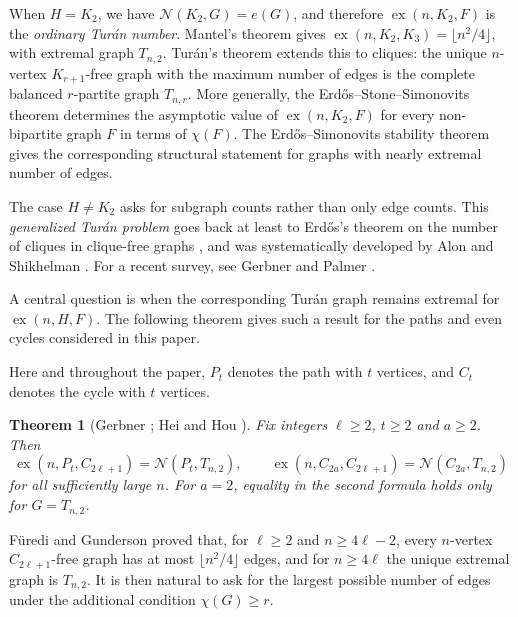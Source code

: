 \documentclass[11pt]{article}
\newtheorem*{knownresult}{Theorem}
\theoremstyle{definition}
\theoremstyle{plain}
\theoremstyle{remark}
\theoremstyle{plain}
\numberwithin{equation}{section}
\DeclareMathOperator{\ex}{ex}
\newcommand{\N}{\mathcal N}
\begin{document}
When $H=K_2$, we have $\N(K_2,G)=e(G)$, and therefore $\ex(n,K_2,F)$ is the \emph{ordinary Tur\'an number}. Mantel's theorem \cite{Mantel1907} gives $\ex(n,K_2,K_3)=\lfloor n^2/4\rfloor$, with extremal graph $T_{n,2}$. Tur\'an's theorem \cite{Turan1941} extends this to cliques: the unique $n$-vertex $K_{r+1}$-free graph with the maximum number of edges is the complete balanced $r$-partite graph $T_{n,r}$. More generally, the Erd\H{o}s--Stone--Simonovits theorem \cite{ErdosStone1946,ErdosSimonovits1966} determines the asymptotic value of $\ex(n,K_2,F)$ for every non-bipartite graph $F$ in terms of $\chi(F)$. The Erd\H{o}s--Simonovits stability theorem \cite{Simonovits1968} gives the corresponding structural statement for graphs with nearly extremal number of edges.

The case $H\ne K_2$ asks for subgraph counts rather than only edge counts. This \emph{generalized Tur\'an problem} goes back at least to Erd\H{o}s's theorem on the number of cliques in clique-free graphs \cite{Erdos1962}, and was systematically developed by Alon and Shikhelman \cite{AlonShikhelman2016}. For a recent survey, see Gerbner and Palmer \cite{GerbnerPalmerSurvey2026}.

A central question is when the corresponding Tur\'an graph remains extremal for $\ex(n,H,F)$. The following theorem gives such a result for the paths and even cycles considered in this paper.

Here and throughout the paper, $P_t$ denotes the path with $t$ vertices, and $C_t$ denotes the cycle with $t$ vertices.

\begin{knownresult}[Gerbner \cite{Gerbner2021}; Hei and Hou \cite{HeiHou2024}]
Fix integers $\ell\ge2$, $t\ge2$ and $a\ge2$. Then
\[
        \ex(n,P_t,C_{2\ell+1})=\N(P_t,T_{n,2}),
        \qquad
        \ex(n,C_{2a},C_{2\ell+1})=\N(C_{2a},T_{n,2})
\]
for all sufficiently large $n$. For $a=2$, equality in the second formula holds only for $G=T_{n,2}$.
\end{knownresult}

F\"uredi and Gunderson \cite{FurediGunderson2015} proved that, for $\ell\ge2$ and $n\ge4\ell-2$, every $n$-vertex $C_{2\ell+1}$-free graph has at most $\lfloor n^2/4\rfloor$ edges, and for $n\ge4\ell$ the unique extremal graph is $T_{n,2}$. It is then natural to ask for the largest possible number of edges under the additional condition $\chi(G)\ge r$.
\end{document}
